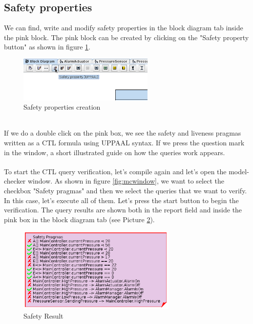 \documentclass[12pt]{article}
\begin{document}
\subsection{Safety properties}
We can find, write and modify safety properties in the block diagram tab inside the pink block. The pink block can be created by clicking on the "Safety property button" as shown in figure \ref{fig:safety}.
\begin{figure}[h!]
\centering
\includegraphics[width=0.6\textwidth]{images/safety.png}
\caption{Safety properties creation}
\label{fig:safety}
\end{figure}
\\If we do a double click on the pink box, we see the safety and liveness pragmas written as a CTL formula using UPPAAL syntax. If we press the question mark in the window, a short illustrated guide on how the queries work appears.
\\\\
To start the CTL query verification, let's compile again and let's open the model-checker window. As shown in figure \ref{fig:mcwindow}, we want to select the checkbox "Safety pragmas" and then we select the queries that we want to verify. In this case, let's execute all of them. Let's press the start button to begin the verification. The query results are shown both in the report field and inside the pink box in the block diagram tab (see Picture \ref{fig:sresult}).
\begin{figure}[h!]
\centering
\includegraphics[width=0.7\textwidth]{images/safety_result.png}
\caption{Safety Result}
\label{fig:sresult}
\end{figure}

\newpage
\end{document}
